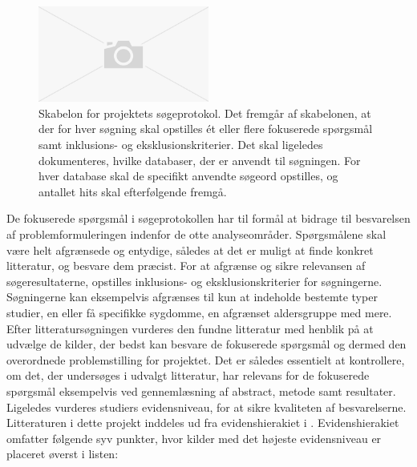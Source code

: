 \begin{figure}[H]
\begin{center}
\includegraphics[width=0.5\textwidth]{figures/cMetode/soegeprotokol}
\end{center}
\caption{Skabelon for projektets søgeprotokol. Det fremgår af skabelonen, at der for hver søgning skal opstilles ét eller flere fokuserede spørgsmål samt inklusions- og eksklusionskriterier. Det skal ligeledes dokumenteres, hvilke databaser, der er anvendt til søgningen. For hver database skal de specifikt anvendte søgeord opstilles, og antallet hits skal efterfølgende fremgå.}
\label{fig:soegeprotokol} 
\end{figure}

De fokuserede spørgsmål i søgeprotokollen har til formål at bidrage til besvarelsen af problemformuleringen indenfor de otte analyseområder. Spørgsmålene skal være helt afgrænsede og entydige, således at det er muligt at finde konkret litteratur, og besvare dem præcist. \citep{metodehaandbogen}  
For at afgrænse og sikre relevansen af søgeresultaterne, opstilles inklusions- og eksklusionskriterier for søgningerne. Søgningerne kan eksempelvis afgrænses til kun at indeholde bestemte typer studier, en eller få specifikke sygdomme, en afgrænset aldersgruppe med mere. \citep{metodehaandbogen} \\
Efter litteratursøgningen vurderes den fundne litteratur med henblik på at udvælge de kilder, der bedst kan besvare de fokuserede spørgsmål og dermed den overordnede problemstilling for projektet. Det er således essentielt at kontrollere, om det, der undersøges i udvalgt litteratur, har relevans for de fokuserede spørgsmål eksempelvis ved gennemlæsning af abstract, metode samt resultater. Ligeledes vurderes studiers evidensniveau, for at sikre kvaliteten af besvarelserne. \citep{metodehaandbogen} 
Litteraturen i dette projekt inddeles ud fra evidenshierakiet i \cite{metodehaandbogen}. Evidenshierakiet omfatter følgende syv punkter, hvor kilder med det højeste evidensniveau er placeret øverst i listen:

